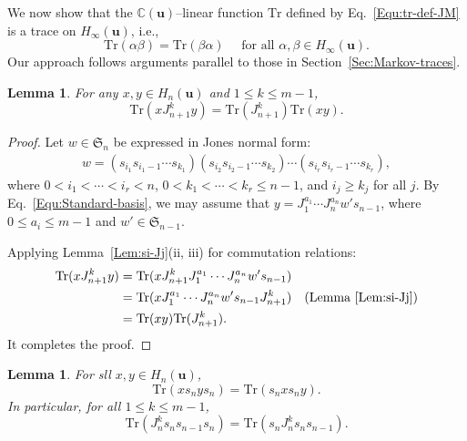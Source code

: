 \documentclass[a4paper, oneside]{amsart}
\numberwithin{equation}{section}
\newtheorem{lemma}[equation]{Lemma}
\theoremstyle{definition}
\theoremstyle{remark}
\begin{document}
We now show that the $\mathbb{C}(\boldsymbol{u})$--linear function $\mathrm{Tr}$ defined by Eq.~\eqref{Equ:tr-def-JM} is a trace on $H_{\infty}(\boldsymbol{u})$, i.e.,
\begin{equation*}
    \mathrm{Tr}(\alpha\beta) = \mathrm{Tr}(\beta\alpha) \quad \text{ for all } \alpha,\beta \in H_{\infty}(\boldsymbol{u}).
\end{equation*}
Our approach follows arguments parallel to those in Section~\ref{Sec:Markov-traces}.

\begin{lemma}\label{Lemm:tr(xJy)=tr(xy)}
For any $x,y \in H_n(\boldsymbol{u})$ and $1 \leq k\leq m-1$,
\begin{equation*}
    \mathrm{Tr}(xJ_{n+1}^k y) = \mathrm{Tr}(J_{n+1}^k) \mathrm{Tr}(xy).
\end{equation*}
\end{lemma}

\begin{proof}
Let $w \in \mathfrak{S}_n$ be expressed in Jones normal form:
\begin{align*}
    w = (s_{i_1}s_{i_1-1}\cdots s_{k_1})(s_{i_2}s_{i_2-1}\cdots s_{k_2}) \cdots (s_{i_r}s_{i_r-1}\cdots s_{k_r}),
\end{align*}
where $0 < i_1 < \cdots < i_r < n$, $0 < k_1 < \cdots < k_r \leq n-1$, and $i_j \geq k_j$ for all $j$. By Eq.~\eqref{Equ:Standard-basis}, we may assume that $y = J_1^{a_1}\cdots J_n^{a_n}w' s_{n-1}$, where $0 \leq a_i\leq m-1$ and $w' \in \mathfrak{S}_{n-1}$.

Applying Lemma~\ref{Lem:si-Jj}(ii, iii) for commutation relations:
\begin{align*}
    \mathrm{Tr}(xJ_{n+1}^k y) &= \mathrm{Tr}(xJ_{n+1}^k J_1^{a_1}\cdots J_n^{a_n}w's_{n-1}) \\
    &= \mathrm{Tr}(xJ_1^{a_1}\cdots J_n^{a_n} w's_{n-1} J_{n+1}^{k}) \quad \text{(Lemma~\ref{Lem:si-Jj})} \\
    &= \mathrm{Tr}(xy) \mathrm{Tr}(J_{n+1}^k). %
\end{align*}
It completes the proof.
\end{proof}

\begin{lemma}\label{Lemm:JM-xs_nys_n}
For sll $x,y\in H_{n}(\boldsymbol{u})$,
\begin{equation*}
    \mathrm{Tr}(xs_nys_n) = \mathrm{Tr}(s_nxs_ny).
\end{equation*}
In particular, for all $1\leq k\leq m-1$,
\begin{equation*}
    \mathrm{Tr}(J_n^ks_ns_{n-1}s_n) = \mathrm{Tr}(s_nJ_n^{k}s_ns_{n-1}).
\end{equation*}
\end{lemma}
\end{document}
